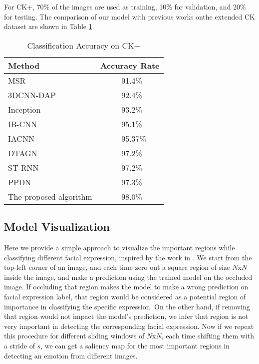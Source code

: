 \documentclass[conference]{IEEEtran}
\begin{document}
For CK+, 70\% of the images are used as training, 10\% for validation, and 20\% for testing.
The comparison of our model with previous works onthe extended CK dataset are shown in Table \ref{table:CK}.
\begin{table}[h]
\centering
  \caption{Classification Accuracy on CK+}
\begin{tabular}{|m{4cm}|c|}
\hline
Method  & Accuracy Rate\\
\hline
MSR \cite{MSR}   &  \ 91.4\%\\
\hline 
3DCNN-DAP \cite{3DCNN} &   \  92.4\% \\
\hline 
Inception \cite{mollahosseini2016going} &   \  93.2\% \\
\hline 
IB-CNN \cite{IBCNN} &   \  95.1\% \\
\hline 
IACNN \cite{IACNN} &   \  \ 95.37\% \\
\hline
DTAGN \cite{DTAGN} &   \  97.2\% \\
\hline
ST-RNN \cite{STRNN} &   \  97.2\% \\
\hline
PPDN \cite{PPDN} & \ 97.3\% \\
\hline
 The proposed algorithm  &  \ 98.0\%\\
\hline
\end{tabular}
\label{table:CK}
\end{table}



\subsection{Model Visualization}
Here we provide a simple approach to visualize the important regions while classifying different facial expression, inspired by the work in \cite{fergus}. 
We start from the top-left corner of an image, and each time zero out a square region of size $N$x$N$ inside the image, and make a prediction using the trained model on the occluded image.
If occluding that region makes the model to make a wrong prediction on facial expression label, that region would be considered as a potential region of importance in classifying the specific expression. 
On the other hand, if removing that region would not impact the model's prediction, we infer that region is not very important in detecting the corresponding facial expression.
Now if we repeat this procedure for different sliding windows of $N$x$N$, each time shifting them with a stride of $s$, we can get a saliency map for the most important regions in detecting an emotion from different images.
\end{document}
